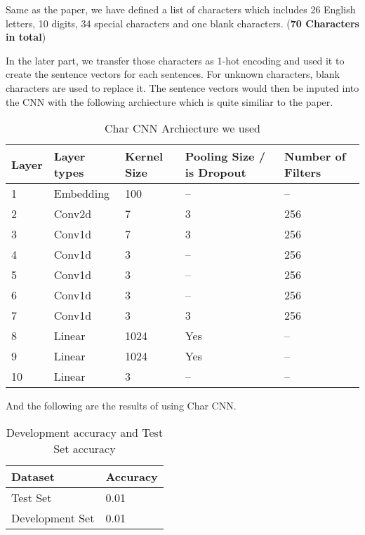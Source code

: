\documentclass{article}
\begin{document}
Same as the paper, we have defined a list of characters which includes 26 English letters, 10 digits, 34 special characters and one blank characters. (\textbf{70 Characters in total})

In the later part, we transfer those characters as 1-hot encoding and used it to create the sentence vectors for each sentences. For unknown characters, blank characters are used to replace it. The sentence vectors would then be inputed into the CNN with the following archiecture which is quite similiar to the paper.

\pagebreak

\begin{table}[htb]
\caption{Char CNN Archiecture we used}
	\label{sample-table}
	\centering
\begin{tabular}{lllll}
\toprule
		\cmidrule{1-5}
		Layer & Layer types & Kernel Size & Pooling Size / is Dropout & Number of Filters 		\\
		\midrule
 			1 & Embedding & 100 & -- & -- \\
 			2 & Conv2d & 7 & 3 & 256 \\
 			3 & Conv1d & 7 & 3 & 256 \\
 			4 & Conv1d & 3 & -- & 256 \\
 			5 & Conv1d & 3 & -- & 256\\
 			6 & Conv1d & 3 & -- & 256 \\
 			7 & Conv1d & 3 & 3 & 256 \\
 			8 & Linear & 1024 & Yes & -- \\
 			9 & Linear & 1024 & Yes & -- \\
 			10 & Linear & 3 & -- & -- \\
\bottomrule
\end{tabular}
\end{table}

And the following are the results of using Char CNN. 

\begin{table}[htb]
	\caption{Development accuracy and Test Set accuracy}
	\label{sample-table}
	\centering
	\begin{tabular}{ll}
		\toprule
		\cmidrule{1-2}
		Dataset &Accuracy\\
		\midrule
		Test Set & 0.01   \\
		Development Set & 0.01  \\
		\bottomrule
	\end{tabular}
\end{table}
\end{document}

